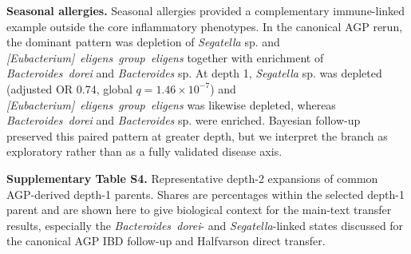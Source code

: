 \documentclass[11pt]{article}
\newcommand{\taxon}[1]{\emph{#1}}
\begin{document}
\medskip

\noindent\textbf{Seasonal allergies.} Seasonal allergies provided a
complementary immune-linked example outside the core inflammatory
phenotypes. In the canonical AGP rerun, the dominant pattern was
depletion of \taxon{Segatella} sp. and
\taxon{[Eubacterium]~eligens~group~eligens} together with enrichment of
\taxon{Bacteroides~dorei} and \taxon{Bacteroides} sp. At depth 1,
\taxon{Segatella} sp. was depleted (adjusted OR 0.74, global
\(q = 1.46\times10^{-7}\)) and
\taxon{[Eubacterium]~eligens~group~eligens} was likewise depleted,
whereas \taxon{Bacteroides~dorei} and \taxon{Bacteroides} sp. were
enriched. Bayesian follow-up preserved this paired pattern at greater
depth, but we interpret the branch as exploratory rather than as a
fully validated disease axis.

\medskip

\noindent\textbf{Supplementary Table S4.} Representative depth-2
expansions of common AGP-derived depth-1 parents. Shares are percentages
within the selected depth-1 parent and are shown here to give biological
context for the main-text transfer results, especially the
\taxon{Bacteroides~dorei}- and \taxon{Segatella}-linked states
discussed for the canonical AGP IBD follow-up and Halfvarson direct
transfer.
\end{document}
